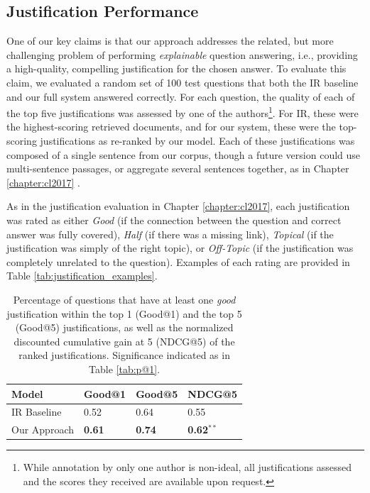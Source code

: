 \subsection{Justification Performance}
\label{sec-emnlp2017:justification_results}
One of our key claims is that our approach addresses the related, but more challenging problem of performing \emph{explainable} question answering, i.e., providing a high-quality, compelling justification for the chosen answer.  To evaluate this claim, we evaluated a random set of 100 test questions that both the IR baseline and our full system answered correctly.  For each question, the quality of each of the top five justifications was assessed by one of the authors\footnote{While annotation by only one author is non-ideal, all justifications assessed and the scores they received are available upon request.}.  For IR, these were the highest-scoring retrieved documents, and for our system, these were the top-scoring justifications as re-ranked by our model.  
Each of these justifications was composed of a single sentence from our corpus, though a future version could use multi-sentence passages, or aggregate several sentences together, as in Chapter \ref{chapter:cl2017} \citep{jansen2017framing}.

As in the justification evaluation in Chapter \ref{chapter:cl2017}, each justification was rated as either \emph{Good} (if the connection between the question and correct answer was fully covered), \emph{Half} (if there was a missing link), \emph{Topical} (if the justification was simply of the right topic), or \emph{Off-Topic} (if the justification was completely unrelated to the question). Examples of each rating are provided in Table \ref{tab:justification_examples}.  

\begin{table}[t]
\begin{center}
\begin{tabular}{llll}
\hline
 Model 			& Good@1 	& Good@5 	& NDCG@5 \\ 
\hline
IR Baseline 	&	0.52 		&	0.64 		& 0.55 \\
Our Approach & 	{\bf 0.61}	 	&	{\bf 0.74}			& {\bf 0.62}$^{**}$ \\
\end{tabular}
\caption{{Percentage of questions that have at least one \emph{good} justification within the top 1 (Good@1) and the top 5 (Good@5) justifications, 
as well as the normalized discounted cumulative gain at 5 (NDCG@5) of the ranked justifications.
 Significance indicated as in Table \ref{tab:p@1}.
}} 
\label{tab:justification_ndcg}
\end{center}
\end{table}



